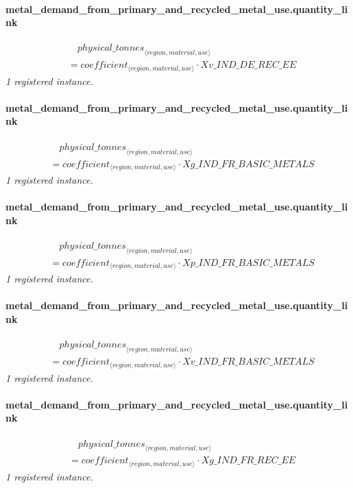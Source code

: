 \documentclass[11pt]{article}
\begin{document}
\paragraph{metal\_demand\_from\_primary\_and\_recycled\_metal\_use.quantity\_link}
\begin{align*}
&\quad {physical\_tonnes}_{\langle region, material, use\rangle}\\
&= coefficient_{\langle region, material, use\rangle} \cdot Xv\_IND\_DE\_REC\_EE
\end{align*}
\noindent\emph{1 registered instance.}\par
\paragraph{metal\_demand\_from\_primary\_and\_recycled\_metal\_use.quantity\_link}
\begin{align*}
&\quad {physical\_tonnes}_{\langle region, material, use\rangle}\\
&= coefficient_{\langle region, material, use\rangle} \cdot Xg\_IND\_FR\_BASIC\_METALS
\end{align*}
\noindent\emph{1 registered instance.}\par
\paragraph{metal\_demand\_from\_primary\_and\_recycled\_metal\_use.quantity\_link}
\begin{align*}
&\quad {physical\_tonnes}_{\langle region, material, use\rangle}\\
&= coefficient_{\langle region, material, use\rangle} \cdot Xp\_IND\_FR\_BASIC\_METALS
\end{align*}
\noindent\emph{1 registered instance.}\par
\paragraph{metal\_demand\_from\_primary\_and\_recycled\_metal\_use.quantity\_link}
\begin{align*}
&\quad {physical\_tonnes}_{\langle region, material, use\rangle}\\
&= coefficient_{\langle region, material, use\rangle} \cdot Xv\_IND\_FR\_BASIC\_METALS
\end{align*}
\noindent\emph{1 registered instance.}\par
\paragraph{metal\_demand\_from\_primary\_and\_recycled\_metal\_use.quantity\_link}
\begin{align*}
&\quad {physical\_tonnes}_{\langle region, material, use\rangle}\\
&= coefficient_{\langle region, material, use\rangle} \cdot Xg\_IND\_FR\_REC\_EE
\end{align*}
\noindent\emph{1 registered instance.}\par
\end{document}
